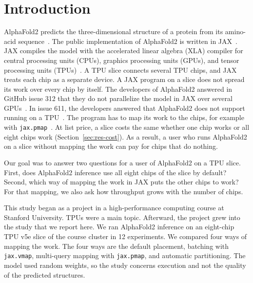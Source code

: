\section{Introduction}\label{sec:intro}

AlphaFold2 predicts the three-dimensional structure of a protein from its amino-acid sequence~\cite{jumper2021alphafold}.
The public implementation of AlphaFold2 is written in JAX~\cite{alphafoldrepo}. JAX compiles the model with the
accelerated linear algebra (XLA) compiler for central processing units (CPUs), graphics processing units (GPUs), and
tensor processing units (TPUs)~\cite{frostig2018jax}. A TPU slice connects several TPU chips, and JAX treats each chip
as a separate device. A JAX program on a slice does not spread its work over every chip by itself. The developers of
AlphaFold2 answered in GitHub issue 312 that they do not parallelize the model in JAX over several GPUs~\cite{af2issue312}. %
In issue 611, the developers answered that AlphaFold2 does not support running on a TPU~\cite{af2issue611}. %
The program has to map its work to the chips, for example with
\texttt{jax.pmap}~\cite{jaxpmap}. At list price, a slice costs the same whether one chip works or all eight chips work
(Section~\ref{sec:res-cost}). As a result, a user who runs AlphaFold2 on a slice without mapping the work can pay for
chips that do nothing.

Our goal was to answer two questions for a user of AlphaFold2 on a TPU slice.
First, does AlphaFold2 inference use all eight chips of the slice by default? Second, which way of mapping the work in JAX puts the other chips to work?
For that mapping, we also ask how throughput grows with the number of chips.

This study began as a project in a high-performance computing course at Stanford University. TPUs were a main topic.
Afterward, the project grew into the study that we report here.
We ran AlphaFold2 inference on an eight-chip TPU v5e slice of the course cluster in 12 experiments. %
We compared four ways of mapping the work. The four ways are the default placement, batching with \texttt{jax.vmap},
multi-query mapping with \texttt{jax.pmap}, and automatic partitioning. The model used random weights, so the study
concerns execution and not the quality of the predicted structures.

